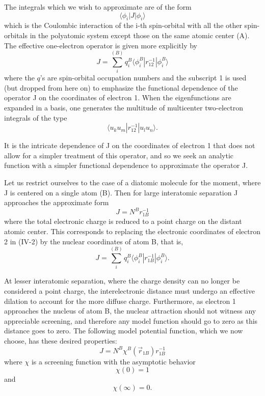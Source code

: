 \documentclass[12pt,letterpaper]{report}
\begin{document}
The integrals which we wish to approximate are of the form
\begin{equation}
\langle \phi_i | J | \phi_i \rangle
\end{equation}
which is the Coulombic interaction of the i-th spin-orbital with all the other spin-orbitals in the polyatomic system except those on the same atomic center (A). The effective one-electron operator is given more explicitly by
\begin{equation}
J = \sum_i^{(B)} q_i^B \langle \phi_i^B | r_{12}^{-1} | \phi_i^B \rangle
\end{equation}
where the $q$'s are spin-orbital occupation numbers and the subscript 1 is used (but dropped from here on) to emphasize the functional dependence of the operator J on the coordinates of electron 1. When the eigenfunctions are expanded in a basis, one generates the multitude of multicenter two-electron integrals of the type
\begin{equation}
\langle u_k u_m | r_{12}^{-1} | u_l u_n \rangle.
\end{equation}

It is the intricate dependence of J on the coordinates of electron 1 that does not allow for a simpler treatment of this operator, and so we seek an analytic function with a simpler functional dependence to approximate the operator J.

Let us restrict ourselves to the case of a diatomic molecule for the moment, where J is centered on a single atom (B). Then for large interatomic separation J approaches the approximate form
\begin{equation}
J = N^B r_{1B}^{-1}
\end{equation}
where the total electronic charge is reduced to a point charge on the distant atomic center. This corresponds to replacing the electronic coordinates of electron 2 in (IV-2) by the nuclear coordinates of atom B, that is,
\begin{equation}
J = \sum_i^{(B)} q_i^B \langle \phi_i^B | r_{1B}^{-1} | \phi_i^B \rangle.
\end{equation}

At lesser interatomic separation, where the charge density can no longer be considered a point charge, the interelectronic distance must undergo an effective dilation to account for the more diffuse charge. Furthermore, as electron 1 approaches the nucleus of atom B, the nuclear attraction should not witness any appreciable screening, and therefore any model function should go to zero as this distance goes to zero. The following model potential function, which we now choose, has these desired properties:
\begin{equation}
J = N^B \chi^B(\vec{r}_{1B}) r_{1B}^{-1}
\end{equation}
where $\chi$ is a screening function with the asymptotic behavior
\begin{equation}
\chi(0) = 1
\end{equation}
and
\begin{equation}
\chi(\infty) = 0.
\end{equation}
\end{document}
